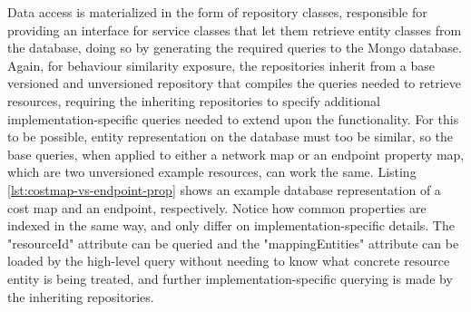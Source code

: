     Data access is materialized in the form of repository classes, responsible for providing an interface for service classes that let them retrieve entity classes from the database, doing so by generating the required queries to the Mongo database.
    Again, for behaviour similarity exposure, the repositories inherit from a base versioned and unversioned repository that compiles the queries needed to retrieve resources, requiring the inheriting repositories to specify additional implementation-specific queries needed to extend upon the functionality.
    For this to be possible, entity representation on the database must too be similar, so the base queries, when applied to either a network map or an endpoint property map, which are two unversioned example resources, can work the same.
    Listing \ref{lst:costmap-vs-endpoint-prop} shows an example database representation of a cost map and an endpoint, respectively.
    Notice how common properties are indexed in the same way, and only differ on implementation-specific details.
    The "resourceId" attribute can be queried and the "mappingEntities" attribute can be loaded by the high-level query without needing to know what concrete resource entity is being treated, and further implementation-specific querying is made by the inheriting repositories.


